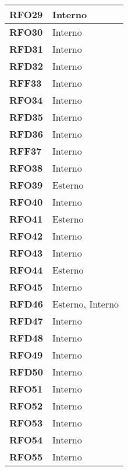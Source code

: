 \begin{longtable}{|>{\centering\arraybackslash}m{}|>{\centering\arraybackslash}m{}|}
	\textbf{RFO29} & Interno \\\hline
	\textbf{RFO30} & Interno \\\hline
	\textbf{RFD31} & Interno \\\hline
	\textbf{RFD32} & Interno \\\hline
	\textbf{RFF33} & Interno \\\hline
	\textbf{RFO34} & Interno \\\hline
	\textbf{RFD35} & Interno \\\hline
	\textbf{RFD36} & Interno \\\hline
	\textbf{RFF37} & Interno \\\hline
	\textbf{RFO38} & Interno \\\hline
	\textbf{RFO39} & Esterno \\\hline
	\textbf{RFO40} & Interno \\\hline
	\textbf{RFO41} & Esterno \\\hline
	\textbf{RFO42} & Interno \\\hline
	\textbf{RFO43} & Interno \\\hline
	\textbf{RFO44} & Esterno \\\hline
	\textbf{RFO45} & Interno \\\hline
	\textbf{RFD46} & Esterno, Interno \\\hline
	\textbf{RFD47} & Interno \\\hline
	\textbf{RFD48} & Interno \\\hline
	\textbf{RFO49} & Interno \\\hline
	\textbf{RFD50} & Interno \\\hline
	\textbf{RFO51} & Interno \\\hline
	\textbf{RFO52} & Interno \\\hline
	\textbf{RFO53} & Interno \\\hline
	\textbf{RFO54} & Interno \\\hline
	\textbf{RFO55} & Interno \\\hline
    

\end{longtable}
